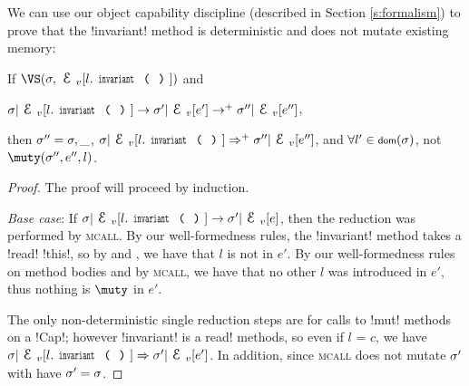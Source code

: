 \begin{Assumption}
\begin{Assumption}
\begin{Assumption}
We can use our object capability discipline (described in Section \ref{s:formalism}) to prove that the \Q!invariant! method is deterministic and does not mutate existing memory:%
\SS\begin{Lemma}[Determinism]\rm If $\VS(\s, \EV[l.\invariant])$ and
\begin{iitemize}
\item $\s|\EV[l.\invariant] \rightarrow \s'|\EV[e'] \rightarrow^{+} \s''|\EV[e'']$,
\end{iitemize}

\indent then $\sigma'' = \sigma,\_$, $\s|\EV[l.\invariant] \Rightarrow^+ \s''|\EV[e'']$, and $\forall l' \in \dom(\s)$, not $\muty(\s'', e'', l)$.
\end{Lemma}\SS
\begin{proof}
The proof will proceed by induction.

\emph{Base case}: If $\s|\EV[l.\invariant] \rightarrow \s'|\EV[e]$, then the reduction was performed by \textsc{mcall}.
By our well-formedness rules, the \Q!invariant! method takes a \Q!read! \Q!this!, so by  and , we have that $l$ is not \muty in $e'$. By our well-formedness rules on method bodies and by \textsc{mcall}, we have that no other $l$ was introduced in $e'$, thus nothing is $\muty$ in $e'$.

The only non-deterministic single reduction steps are for calls to \Q!mut! methods on a \Q!Cap!; however \Q!invariant! is a \!read! methods, so even if $l$ = $c$, we have $\s|\EV[l.\invariant] \Rightarrow \s'|\EV[e']$. In addition, since \textsc{mcall} does not mutate $\sigma'$ with have $\sigma' = \sigma$.


\end{proof}
\end{Assumption}
\end{Assumption}
\end{Assumption}
